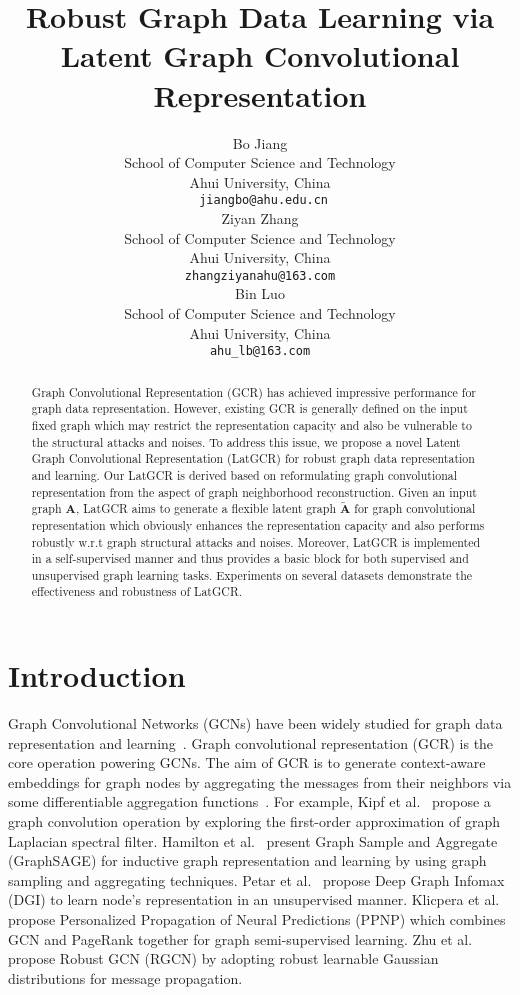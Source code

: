 \documentclass{article}
\title{Robust Graph Data Learning via Latent Graph Convolutional Representation}
\author{Bo Jiang \\
 School of Computer Science and Technology\\
 Ahui University, China\\
  \texttt{ jiangbo@ahu.edu.cn} \\
\And
  Ziyan Zhang \\
School of Computer Science and Technology\\
 Ahui University, China\\
 \texttt{zhangziyanahu@163.com} \\
  \AND
  Bin Luo \\
  School of Computer Science and Technology\\
 Ahui University, China\\
  \texttt{ahu\_lb@163.com} \\
}
\begin{document}
\maketitle

\begin{abstract}
 Graph Convolutional Representation (GCR) has achieved impressive performance for graph data representation.
However, existing GCR is generally defined on the input fixed graph which may restrict the representation capacity and also be vulnerable to the  structural attacks and noises. To address this issue, we propose a novel Latent Graph Convolutional Representation (LatGCR) for robust graph data representation and learning. Our LatGCR is derived based on reformulating graph convolutional representation from the aspect of graph neighborhood reconstruction. Given an input graph $\textbf{A}$, LatGCR aims to generate a flexible latent graph $\widetilde{\textbf{A}}$ for graph convolutional representation which obviously enhances the representation capacity and also performs robustly w.r.t graph structural attacks and noises. Moreover, LatGCR is implemented in a self-supervised manner and thus provides a basic block for both supervised and unsupervised graph learning tasks.
Experiments on several  datasets demonstrate the effectiveness and robustness of LatGCR.
\end{abstract}

\section{Introduction}
Graph Convolutional Networks (GCNs) have been widely studied for graph data representation and learning~\cite{defferrard2016convolutional,kipf2016semi,velickovic2017graph,DGI,IDGL,GECN}.
Graph convolutional representation (GCR) is the core
operation powering GCNs.
The aim of GCR is to generate context-aware embeddings for graph nodes by aggregating the messages from their neighbors  via some differentiable aggregation functions~\cite{graphsage,NEURIPS2020_99e314b1}.
For example,
Kipf et al.~\cite{kipf2016semi} propose a graph convolution operation by exploring the first-order approximation of graph Laplacian spectral filter. 
Hamilton et al.~\cite{graphsage} present Graph Sample and Aggregate (GraphSAGE) for inductive graph representation and learning by using graph sampling and aggregating techniques. 
Petar et al.~\cite{DGI} propose Deep Graph Infomax (DGI) to learn node's representation in an unsupervised manner.
Klicpera et al.~\cite{APPNP} propose Personalized Propagation of Neural Predictions (PPNP) which combines GCN and PageRank together for graph semi-supervised learning.
Zhu et al.~\cite{RGCN} propose Robust GCN (RGCN) by adopting robust learnable Gaussian distributions for message propagation.
\end{document}
